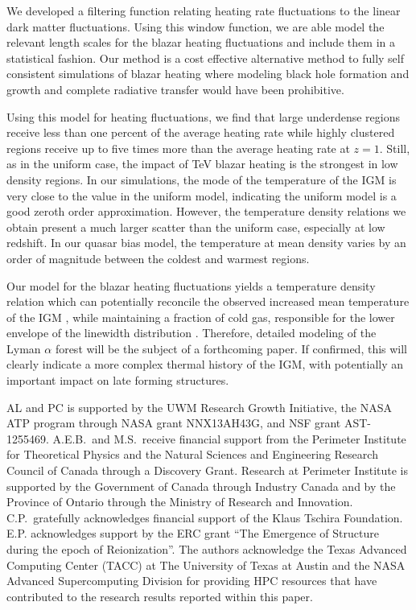 \documentclass[twocolumns]{emulateapj}
\begin{document}
We developed a filtering function relating heating rate fluctuations to the linear dark matter fluctuations. Using this window function, we are able model the relevant length scales for the blazar heating fluctuations and include them in a statistical fashion. Our method is a cost effective alternative method to fully self consistent simulations of blazar heating where modeling black hole formation and growth and complete radiative transfer would have been prohibitive. 

Using this model for heating fluctuations, we find that large underdense regions receive less than one percent of the average heating rate while highly clustered regions receive up to five times more than the average heating rate at $z=1$. Still, as in the uniform case, the impact of TeV blazar heating is the strongest in low density regions. In our simulations, the mode of the temperature of the IGM is very close to the value in the uniform model, indicating the uniform model is a good zeroth order approximation. However, the temperature density relations we obtain present a much larger scatter than the uniform case, especially at low redshift. In our quasar bias model, the temperature at mean density varies by an order of magnitude between the coldest and warmest regions. 

Our model for the blazar heating fluctuations yields a temperature density relation which can potentially reconcile the observed increased mean temperature of the IGM \citep{2014MNRAS.441.1916B}, while maintaining a fraction of cold gas, responsible for the lower envelope of the linewidth distribution \citep{2012ApJ...757L..30R}. Therefore, detailed modeling of the Lyman $\alpha$ forest will be the subject of a forthcoming paper. If confirmed, this will clearly indicate a more complex  thermal history of the IGM, with potentially an important impact on late forming structures. 



\begin{acknowledgements}
AL and PC is supported by the UWM Research Growth Initiative, the NASA ATP
program through NASA grant NNX13AH43G, and NSF grant AST-1255469. 
A.E.B.~and M.S.~receive financial support from the Perimeter
Institute for Theoretical Physics and the Natural Sciences and
Engineering Research Council of Canada through a Discovery Grant.
Research at Perimeter Institute is supported by the Government of
Canada through Industry Canada and by the Province of Ontario through
the Ministry of Research and Innovation.
C.P.~gratefully acknowledges
financial support of the Klaus Tschira Foundation. E.P. acknowledges support by the ERC grant ``The Emergence of Structure during the epoch of Reionization''.
The authors acknowledge the Texas Advanced Computing Center (TACC) at The University of Texas at Austin and the NASA Advanced Supercomputing Division for providing HPC resources that have contributed to the research results reported within this paper. 
\end{acknowledgements}
\end{document}
